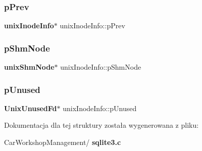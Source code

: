 \mbox{\label{structunix_inode_info_a6575edce9898b48870c6f48047c01d01}} 
\subsubsection{pPrev}
{\footnotesize\ttfamily \textbf{ unix\+Inode\+Info}$\ast$ unix\+Inode\+Info\+::p\+Prev}

\mbox{\label{structunix_inode_info_a302a8b82e27d5b3624ec122bc9c2ed61}} 
\subsubsection{pShmNode}
{\footnotesize\ttfamily \textbf{ unix\+Shm\+Node}$\ast$ unix\+Inode\+Info\+::p\+Shm\+Node}

\mbox{\label{structunix_inode_info_a0dda9ad35734fa161d1f0b13b671c1c6}} 
\subsubsection{pUnused}
{\footnotesize\ttfamily \textbf{ Unix\+Unused\+Fd}$\ast$ unix\+Inode\+Info\+::p\+Unused}



Dokumentacja dla tej struktury została wygenerowana z pliku\+:\begin{DoxyCompactItemize}
\item 
Car\+Workshop\+Management/\textbf{ sqlite3.\+c}\end{DoxyCompactItemize}
